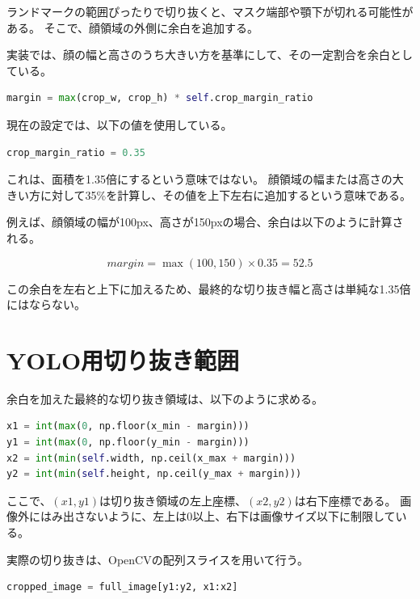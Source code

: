 \documentclass[uplatex,dvipdfmx]{jsarticle}
\begin{document}
ランドマークの範囲ぴったりで切り抜くと、マスク端部や顎下が切れる可能性がある。
そこで、顔領域の外側に余白を追加する。

実装では、顔の幅と高さのうち大きい方を基準にして、その一定割合を余白としている。

\begin{lstlisting}[language=Python]
margin = max(crop_w, crop_h) * self.crop_margin_ratio
\end{lstlisting}

現在の設定では、以下の値を使用している。

\begin{lstlisting}[language=Python]
crop_margin_ratio = 0.35
\end{lstlisting}

これは、面積を1.35倍にするという意味ではない。
顔領域の幅または高さの大きい方に対して35\%を計算し、その値を上下左右に追加するという意味である。

例えば、顔領域の幅が100px、高さが150pxの場合、余白は以下のように計算される。

\begin{equation}
  margin = \max(100, 150) \times 0.35 = 52.5
\end{equation}

この余白を左右と上下に加えるため、最終的な切り抜き幅と高さは単純な1.35倍にはならない。

\section{YOLO用切り抜き範囲}

余白を加えた最終的な切り抜き領域は、以下のように求める。

\begin{lstlisting}[language=Python]
x1 = int(max(0, np.floor(x_min - margin)))
y1 = int(max(0, np.floor(y_min - margin)))
x2 = int(min(self.width, np.ceil(x_max + margin)))
y2 = int(min(self.height, np.ceil(y_max + margin)))
\end{lstlisting}

ここで、$(x1, y1)$は切り抜き領域の左上座標、$(x2, y2)$は右下座標である。
画像外にはみ出さないように、左上は0以上、右下は画像サイズ以下に制限している。

実際の切り抜きは、OpenCVの配列スライスを用いて行う。

\begin{lstlisting}[language=Python]
cropped_image = full_image[y1:y2, x1:x2]
\end{lstlisting}
\end{document}
